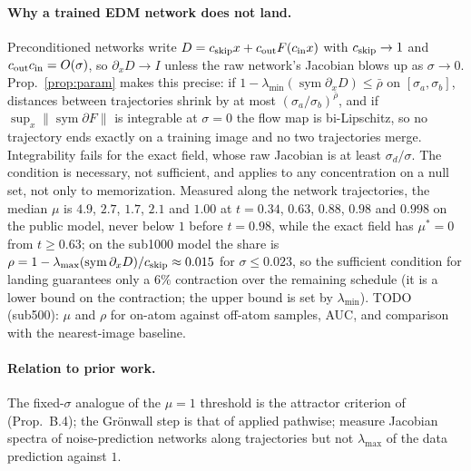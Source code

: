 \paragraph{Why a trained EDM network does not land.}
Preconditioned networks write $D=c_{\rm skip}x+c_{\rm out}F(c_{\rm in}x)$ with $c_{\rm skip}\to1$ and
$c_{\rm out}c_{\rm in}=O(\sigma)$, so $\partial_x D\to I$ unless the raw network's Jacobian blows up
as $\sigma\to0$. Prop.~\ref{prop:param} %
makes this precise: if $1-\lambda_{\min}(\operatorname{sym}\partial_x D)\le\bar\rho$ on
$[\sigma_a,\sigma_b]$, distances between trajectories shrink by at most
$(\sigma_a/\sigma_b)^{\bar\rho}$, and if $\sup_x\|\operatorname{sym}\partial F\|$ is integrable at
$\sigma=0$ the flow map is bi-Lipschitz, so no trajectory ends exactly on a training image and no
two trajectories merge. Integrability fails for the exact field, whose raw Jacobian is at least
$\sigma_d/\sigma$. The condition is necessary, not sufficient, and applies to any concentration on a
null set, not only to memorization. Measured
along the network trajectories, the median $\mu$ is $4.9$, $2.7$, $1.7$, $2.1$ and $1.00$ at
$t=0.34$, $0.63$, $0.88$, $0.98$ and $0.998$ on the public model, never below $1$ before $t=0.98$,
while the exact field has $\mu^*=0$ from $t\ge0.63$; on the sub1000 model the share is
$\rho=1-\lambda_{\max}(\operatorname{sym}\partial_x D)/c_{\rm skip}\approx0.015$ for
$\sigma\le0.023$, so the sufficient condition for landing guarantees only a $6\%$
contraction over the remaining schedule (it is a lower bound on the contraction; the upper bound is set by
$\lambda_{\min}$). TODO (sub500): $\mu$ and $\rho$ for on-atom against off-atom samples, AUC, and comparison
with the nearest-image baseline.

\paragraph{Relation to prior work.}
The fixed-$\sigma$ analogue of the $\mu=1$ threshold is the attractor criterion of
\citet{lopezamado2026} (Prop.~B.4); %
the Gr\"onwall step is that of \citet{kwon2022score} %
applied pathwise; \citet{jaziri2026} %
measure Jacobian spectra of noise-prediction networks along trajectories but not
$\lambda_{\max}$ of the data prediction against $1$.
